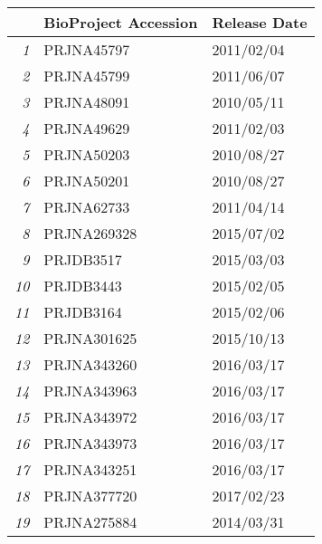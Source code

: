 \begin{table}[ht]
\centering
\begin{tabular}{rll}
  \hline
 & BioProject Accession & Release Date \\ 
  \hline
{\emph{1}} & PRJNA45797 & 2011/02/04 \\ 
  {\emph{2}} & PRJNA45799 & 2011/06/07 \\ 
  {\emph{3}} & PRJNA48091 & 2010/05/11 \\ 
  {\emph{4}} & PRJNA49629 & 2011/02/03 \\ 
  {\emph{5}} & PRJNA50203 & 2010/08/27 \\ 
  {\emph{6}} & PRJNA50201 & 2010/08/27 \\ 
  {\emph{7}} & PRJNA62733 & 2011/04/14 \\ 
  {\emph{8}} & PRJNA269328 & 2015/07/02 \\ 
  {\emph{9}} & PRJDB3517 & 2015/03/03 \\ 
  {\emph{10}} & PRJDB3443 & 2015/02/05 \\ 
  {\emph{11}} & PRJDB3164 & 2015/02/06 \\ 
  {\emph{12}} & PRJNA301625 & 2015/10/13 \\ 
  {\emph{13}} & PRJNA343260 & 2016/03/17 \\ 
  {\emph{14}} & PRJNA343963 & 2016/03/17 \\ 
  {\emph{15}} & PRJNA343972 & 2016/03/17 \\ 
  {\emph{16}} & PRJNA343973 & 2016/03/17 \\ 
  {\emph{17}} & PRJNA343251 & 2016/03/17 \\ 
  {\emph{18}} & PRJNA377720 & 2017/02/23 \\ 
  {\emph{19}} & PRJNA275884 & 2014/03/31 \\ 
   \hline
\end{tabular}
\end{table}
